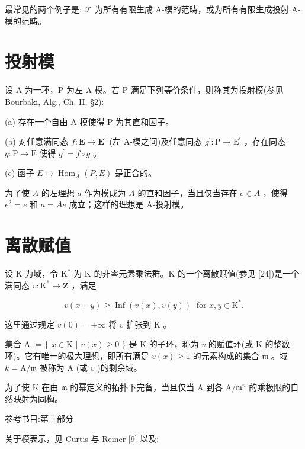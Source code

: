 \documentclass[10pt]{article}
\begin{document}
最常见的两个例子是: \(\mathcal{F}\) 为所有有限生成 A-模的范畴，或为所有有限生成投射 A-模的范畴。

\section*{投射模}

设 A 为一环，P 为左 A-模。若 P 满足下列等价条件，则称其为投射模(参见 Bourbaki, Alg., Ch. II, §2):

(a) 存在一个自由 A-模使得 \(\mathrm{P}\) 为其直和因子。

(b) 对任意满同态 \(f : \mathbf{E} \rightarrow  {\mathbf{E}}^{\prime }\) (左 A-模之间)及任意同态 \({g}^{\prime } : \mathrm{P} \rightarrow  {\mathrm{E}}^{\prime }\) ，存在同态 \(g : \mathrm{P} \rightarrow  \mathrm{E}\) 使得 \({g}^{\prime } = f \circ  g\) 。

(c) 函子 \(E \mapsto  {\operatorname{Hom}}_{A}\left( {P,E}\right)\) 是正合的。

为了使 \(A\) 的左理想 \(a\) 作为模成为 \(A\) 的直和因子，当且仅当存在 \(e \in  A\) ，使得 \({e}^{2} = e\) 和 \(a = {Ae}\) 成立；这样的理想是 A-投射模。

\section*{离散赋值}

设 \(\mathrm{K}\) 为域，令 \({\mathrm{K}}^{ * }\) 为 K 的非零元素乘法群。K 的一个离散赋值(参见 [24])是一个满同态 \(v : {\mathrm{K}}^{ * } \rightarrow  \mathbf{Z}\) ，满足

\[
v\left( {x + y}\right)  \geq  \operatorname{Inf}\left( {v\left( x\right) ,v\left( y\right) }\right) \;\text{ for }x,y \in  {\mathrm{K}}^{ * }.
\]

这里通过规定 \(v\left( 0\right)  =  + \infty\) 将 \(v\) 扩张到 \(\mathrm{K}\) 。

集合 \(\mathrm{A}\) := \{ \(x \in  \mathrm{K}\) | \(v\left( x\right)  \geq  0\) \} 是 \(\mathrm{K}\) 的子环，称为 \(v\) 的赋值环(或 \(\mathrm{K}\) 的整数环)。它有唯一的极大理想，即所有满足 \(v\left( x\right)  \geq  1\) 的元素构成的集合 \(\mathfrak{m}\) 。域 \(k = \mathrm{A}/\mathfrak{m}\) 被称为 \(\mathrm{A}\) (或 \(v\) )的剩余域。

为了使 \(\mathrm{K}\) 在由 \(\mathfrak{m}\) 的幂定义的拓扑下完备，当且仅当 A 到各 \(\mathrm{A}/{\mathfrak{m}}^{n}\) 的乘极限的自然映射为同构。

参考书目:第三部分

关于模表示，见 Curtis 与 Reiner [9] 以及:
\end{document}
